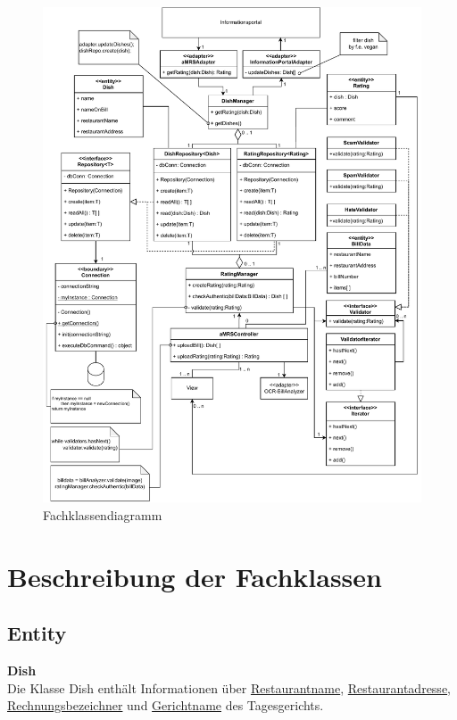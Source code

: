 \begin{figure}[H]
    \centering
    \caption{Fachklassendiagramm} \label{fig:Fachklassendiagramm}
    \includegraphics[width=\textwidth,keepaspectratio]{images/Fachklassenmodell}
\end{figure}

\section*{Beschreibung der Fachklassen}

\subsection*{Entity}
\textbf{Dish} \\
Die Klasse Dish enthält Informationen über \hyperref[gls:restaurantname]{Restaurantname}, \hyperref[gls:restaurantadresse]{Restaurantadresse}, \hyperref[gls:Rechnungsbezeichner]{Rechnungsbezeichner} und \hyperref[gls:gerichtname]{Gerichtname} des
Tagesgerichts.
\newline

